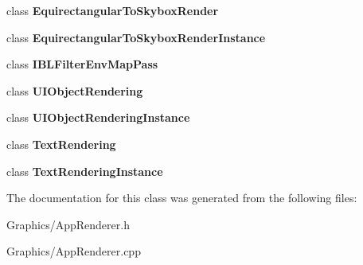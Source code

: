 \begin{DoxyCompactItemize}
class {\bfseries Equirectangular\+To\+Skybox\+Render}
\item 
\mbox{\label{classAppRenderer_a2ed53da06aa8c96971b58644b85ea2d3}} 
class {\bfseries Equirectangular\+To\+Skybox\+Render\+Instance}
\item 
\mbox{\label{classAppRenderer_afeb3653020f8cc65d4b08c7ea9559a43}} 
class {\bfseries I\+B\+L\+Filter\+Env\+Map\+Pass}
\item 
\mbox{\label{classAppRenderer_a931e3cacb3eb1341332fd7477decd15d}} 
class {\bfseries U\+I\+Object\+Rendering}
\item 
\mbox{\label{classAppRenderer_af8087aef5ebe8f9a42bfabe1e0672728}} 
class {\bfseries U\+I\+Object\+Rendering\+Instance}
\item 
\mbox{\label{classAppRenderer_a4708d497b34a7f0c5e0a38cfa536a26c}} 
class {\bfseries Text\+Rendering}
\item 
\mbox{\label{classAppRenderer_a5532c3b535b4f2a814054dba701936df}} 
class {\bfseries Text\+Rendering\+Instance}
\end{DoxyCompactItemize}


The documentation for this class was generated from the following files\+:\begin{DoxyCompactItemize}
\item 
Graphics/App\+Renderer.\+h\item 
Graphics/App\+Renderer.\+cpp\end{DoxyCompactItemize}
